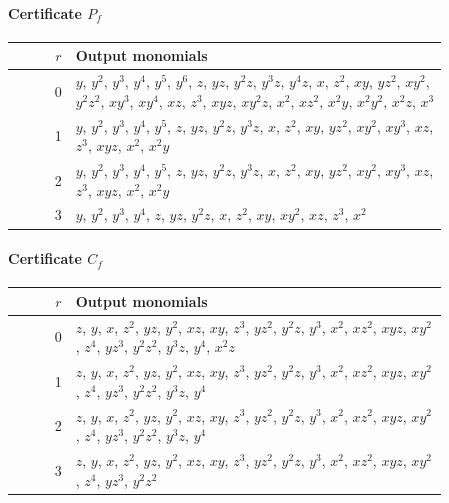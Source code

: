 \documentclass[11pt]{amsart}
\theoremstyle{definition}
\theoremstyle{remark}
\numberwithin{equation}{section}
\begin{document}
\paragraph*{Certificate $P_f$}
\begin{center}
\begin{tabular}{rp{0.86\linewidth}}
$r$ & Output monomials\\\hline
0 & \(y\), \(y^{2}\), \(y^{3}\), \(y^{4}\), \(y^{5}\), \(y^{6}\), \(z\), \(yz\), \(y^{2}z\), \(y^{3}z\), \(y^{4}z\), \(x\), \(z^{2}\), \(xy\), \(yz^{2}\), \(xy^{2}\), \(y^{2}z^{2}\), \(xy^{3}\), \(xy^{4}\), \(xz\), \(z^{3}\), \(xyz\), \(xy^{2}z\), \(x^{2}\), \(xz^{2}\), \(x^{2}y\), \(x^{2}y^{2}\), \(x^{2}z\), \(x^{3}\)\\
1 & \(y\), \(y^{2}\), \(y^{3}\), \(y^{4}\), \(y^{5}\), \(z\), \(yz\), \(y^{2}z\), \(y^{3}z\), \(x\), \(z^{2}\), \(xy\), \(yz^{2}\), \(xy^{2}\), \(xy^{3}\), \(xz\), \(z^{3}\), \(xyz\), \(x^{2}\), \(x^{2}y\)\\
2 & \(y\), \(y^{2}\), \(y^{3}\), \(y^{4}\), \(y^{5}\), \(z\), \(yz\), \(y^{2}z\), \(y^{3}z\), \(x\), \(z^{2}\), \(xy\), \(yz^{2}\), \(xy^{2}\), \(xy^{3}\), \(xz\), \(z^{3}\), \(xyz\), \(x^{2}\), \(x^{2}y\)\\
3 & \(y\), \(y^{2}\), \(y^{3}\), \(y^{4}\), \(z\), \(yz\), \(y^{2}z\), \(x\), \(z^{2}\), \(xy\), \(xy^{2}\), \(xz\), \(z^{3}\), \(x^{2}\)\\
\end{tabular}
\end{center}

\paragraph*{Certificate $C_f$}
\begin{center}
\begin{tabular}{rp{0.86\linewidth}}
$r$ & Output monomials\\\hline
0 & \(z\), \(y\), \(x\), \(z^{2}\), \(yz\), \(y^{2}\), \(xz\), \(xy\), \(z^{3}\), \(yz^{2}\), \(y^{2}z\), \(y^{3}\), \(x^{2}\), \(xz^{2}\), \(xyz\), \(xy^{2}\), \(z^{4}\), \(yz^{3}\), \(y^{2}z^{2}\), \(y^{3}z\), \(y^{4}\), \(x^{2}z\)\\
1 & \(z\), \(y\), \(x\), \(z^{2}\), \(yz\), \(y^{2}\), \(xz\), \(xy\), \(z^{3}\), \(yz^{2}\), \(y^{2}z\), \(y^{3}\), \(x^{2}\), \(xz^{2}\), \(xyz\), \(xy^{2}\), \(z^{4}\), \(yz^{3}\), \(y^{2}z^{2}\), \(y^{3}z\), \(y^{4}\)\\
2 & \(z\), \(y\), \(x\), \(z^{2}\), \(yz\), \(y^{2}\), \(xz\), \(xy\), \(z^{3}\), \(yz^{2}\), \(y^{2}z\), \(y^{3}\), \(x^{2}\), \(xz^{2}\), \(xyz\), \(xy^{2}\), \(z^{4}\), \(yz^{3}\), \(y^{2}z^{2}\), \(y^{3}z\), \(y^{4}\)\\
3 & \(z\), \(y\), \(x\), \(z^{2}\), \(yz\), \(y^{2}\), \(xz\), \(xy\), \(z^{3}\), \(yz^{2}\), \(y^{2}z\), \(y^{3}\), \(x^{2}\), \(xz^{2}\), \(xyz\), \(xy^{2}\), \(z^{4}\), \(yz^{3}\), \(y^{2}z^{2}\)\\
\end{tabular}
\end{center}
\end{document}
